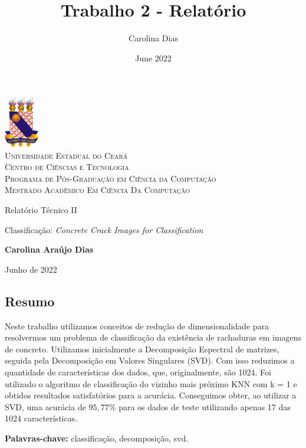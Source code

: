 \documentclass[a4paper, 12pt]{article}
\title{Trabalho 2 - Relatório}
\author{Carolina Dias}
\date{June 2022}
\theoremstyle{definition}
\theoremstyle{remark}
\begin{document}
\begin{titlepage}
	\begin{center}
	    \includegraphics[width=1.5cm]{logo-uece}\\
		\textsc{Universidade Estadual do Ceará\\Centro de Ciências e Tecnologia\\Programa de Pós-Graduação em Ciência da Computação\\Mestrado Acadêmico Em Ciência Da Computação}
		
		\vspace{5cm}
		{\small {\textsc Relatório Técnico II}}
		
		\vspace{1cm}
		
		{\huge Classificação: \textit{Concrete Crack Images for Classification}}
		
		\vspace{1cm}
		\textbf{Carolina Araújo Dias}
		
		\vspace{6.5cm}
		Junho de 2022
		
	\end{center}
\end{titlepage}

\begin{center}
    \section*{Resumo}
\end{center}

Neste trabalho utilizamos conceitos de redução de dimensionalidade para resolvermos um problema de classificação da existência de rachaduras em imagens de concreto. Utilizamos inicialmente a Decomposição Espectral de matrizes, seguida pela Decomposição em Valores Singulares (SVD). Com isso reduzimos a quantidade de características dos dados, que, originalmente, são 1024. Foi utilizado o algoritmo de classificação do vizinho mais próximo KNN com k = 1 e obtidos resultados satisfatórios para a acurácia. Conseguimos obter, ao utilizar a SVD, uma acurácia de $95,77\%$ para os dados de teste utilizando apenas 17 das 1024 características.

\textbf{Palavras-chave:} classificação, decomposição, svd. 
\end{document}
